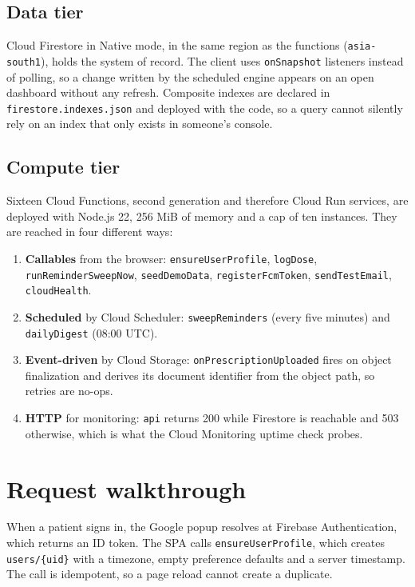 \documentclass[11pt,a4paper]{report}
\begin{document}
\subsection{Data tier}
Cloud Firestore in Native mode, in the same region as the functions (\texttt{asia-south1}), holds the
system of record. The client uses \texttt{onSnapshot} listeners instead of polling, so a change written
by the scheduled engine appears on an open dashboard without any refresh. Composite indexes are
declared in \texttt{firestore.indexes.json} and deployed with the code, so a query cannot silently rely
on an index that only exists in someone's console.

\subsection{Compute tier}
Sixteen Cloud Functions, second generation and therefore Cloud Run services, are deployed with Node.js
22, 256 MiB of memory and a cap of ten instances. They are reached in four different ways:

\begin{enumerate}
  \item \textbf{Callables} from the browser: \texttt{ensureUserProfile}, \texttt{logDose},
        \texttt{runReminderSweepNow}, \texttt{seedDemoData}, \texttt{registerFcmToken},
        \texttt{sendTestEmail}, \texttt{cloudHealth}.
  \item \textbf{Scheduled} by Cloud Scheduler: \texttt{sweepReminders} (every five minutes) and
        \texttt{dailyDigest} (08:00 UTC).
  \item \textbf{Event-driven} by Cloud Storage: \texttt{onPrescriptionUploaded} fires on object
        finalization and derives its document identifier from the object path, so retries are no-ops.
  \item \textbf{HTTP} for monitoring: \texttt{api} returns 200 while Firestore is reachable and 503
        otherwise, which is what the Cloud Monitoring uptime check probes.
\end{enumerate}

\section{Request walkthrough}

When a patient signs in, the Google popup resolves at Firebase Authentication, which returns an ID
token. The SPA calls \texttt{ensureUserProfile}, which creates \texttt{users/\{uid\}} with a timezone,
empty preference defaults and a server timestamp. The call is idempotent, so a page reload cannot
create a duplicate.
\end{document}
